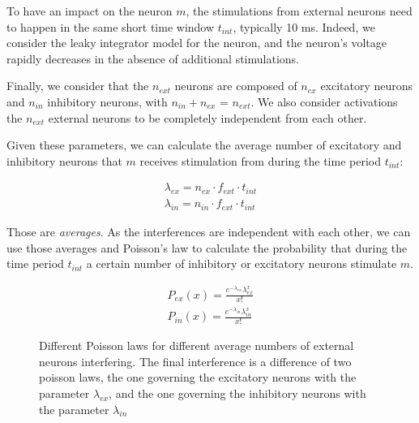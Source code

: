 \documentclass[journal]{IEEEtran}
\begin{document}
To have an impact on the neuron $m$, the stimulations from external neurons need to happen in the same short time window $t_{int}$, typically 10 ms. Indeed, we consider the leaky integrator model\cite{jaeger2007optimization} for the neuron, and the neuron's voltage rapidly decreases in the absence of additional stimulations.

Finally, we consider that the $n_{ext}$ neurons are composed of $n_{ex}$ excitatory neurons and $n_{in}$ inhibitory neurons, with $n_{in} + n_{ex}$ = $n_{ext}$. We also consider activations the $n_{ext}$ external neurons to be completely independent from each other.

Given these parameters, we can calculate the average number of excitatory and inhibitory neurons that $m$ receives stimulation from during the time period $t_{int}$:

\begin{align}
\lambda_{ex} = n_{ex}\cdot f_{ext} \cdot t_{int}\\
\lambda_{in} = n_{in}\cdot f_{ext} \cdot t_{int}
\end{align}

Those are \emph{averages}. As the interferences are independent with each other, we can use those averages and Poisson's law to calculate the probability that during the time period $t_{int}$ a certain number of inhibitory or excitatory neurons stimulate $m$.

\begin{align}
P_{ex}\left( x \right) = \frac{{e^{ - \lambda_{ex} } \lambda_{ex} ^x }}{{x!}}\\
P_{in}\left( x \right) = \frac{{e^{ - \lambda_{in} } \lambda_{in} ^x }}{{x!}}
\end{align} 

\begin{figure}
\caption{Different Poisson laws for different average numbers of external neurons interfering. The final interference is a difference of two poisson laws, the one governing the excitatory neurons with the parameter $\lambda_{ex}$, and the one governing the inhibitory neurons with the parameter $\lambda_{in}$}
\label{fig:poisson}
\end{figure}
\end{document}
